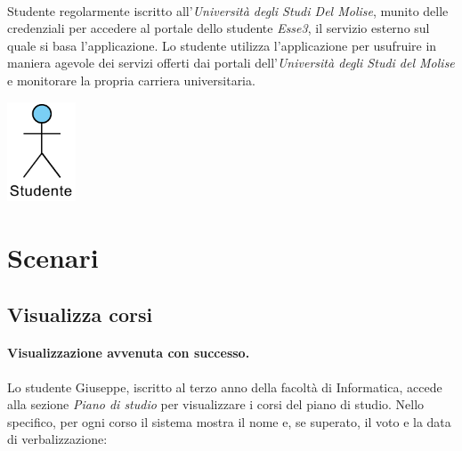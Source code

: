 \paragraph{} 
Studente regolarmente iscritto all’\textit{Università degli Studi Del Molise}, munito delle credenziali per accedere al portale dello studente \textit{Esse3}, il servizio esterno sul quale si basa l’applicazione. Lo studente utilizza l’applicazione per usufruire in maniera agevole dei servizi offerti dai portali dell’\textit{Università degli Studi del Molise} e monitorare la propria carriera universitaria.
\begin{center}
	\includegraphics[width=0.8in]{imgs/gruppo1/Attore-Studente.pdf}
\end{center}
\newpage




\section{Scenari}
\subsection{Visualizza corsi}
\paragraph{Visualizzazione avvenuta con successo.} 
Lo studente Giuseppe, iscritto al terzo anno della facoltà di Informatica, accede alla sezione \textit{Piano di studio} per visualizzare i corsi del piano di studio. Nello specifico, per ogni corso il sistema mostra il nome e, se superato, il voto e la data di verbalizzazione:

